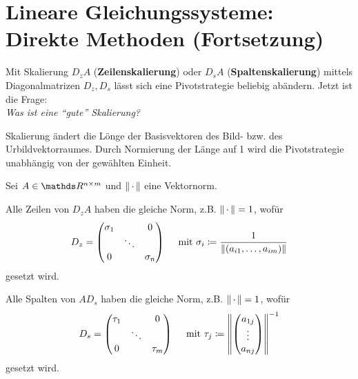 % 
% 
% 
% 



\chapter{Lineare Gleichungssysteme: Direkte Methoden (Fortsetzung)}


Mit Skalierung $D_zA$ (\textbf{Zeilenskalierung}) oder
$D_sA$ (\textbf{Spaltenskalierung})
mittels Diagonalmatrizen $D_z, D_s$ lässt sich eine Pivotstrategie beliebig abändern.
Jetzt ist die Frage: \\
\textit{Was ist eine \enquote{gute} Skalierung?}

Skalierung ändert die Lönge der Basisvektoren des Bild- bzw. des Urbildvektorraumes.
Durch Normierung der Länge auf 1 wird die Pivotstrategie unabhängig von der 
gewählten Einheit.

Sei $A\in\Renm $ und $\left\| \,\cdot\, \right\| $ eine Vektornorm.


 
Alle Zeilen von $D_zA$ haben die gleiche Norm, z.B. $\left\| \,\cdot\, \right\| =1$, wofür 
\begin{gather}
  D_z = \begin{pmatrix}
    \sigma_1 & & 0 \\
    &\ddots & \\ 
    0 && \sigma_n
  \end{pmatrix}
  \quad \text{ mit }\sigma_i\coloneqq \frac{1}{\left\| (a_{i1}, \dots , a_{im}) \right\|}
  \label{IV.1.1}
\end{gather}
gesetzt wird.


 
Alle Spalten von $AD_s$ haben die gleiche Norm, z.B. $\left\| \,\cdot\, \right\| =1$, wofür 
\begin{gather}
  D_s = \begin{pmatrix}
    \tau_1 & & 0 \\
    &\ddots & \\ 
    0 && \tau_m
  \end{pmatrix}
  \quad \text{ mit }\tau_j\coloneqq \left\| \begin{pmatrix}
      a_{1j} \\ \vdots \\ a_{nj}
    \end{pmatrix} \right\|^{-1}
  \label{IV.1.2}
\end{gather}
gesetzt wird.

